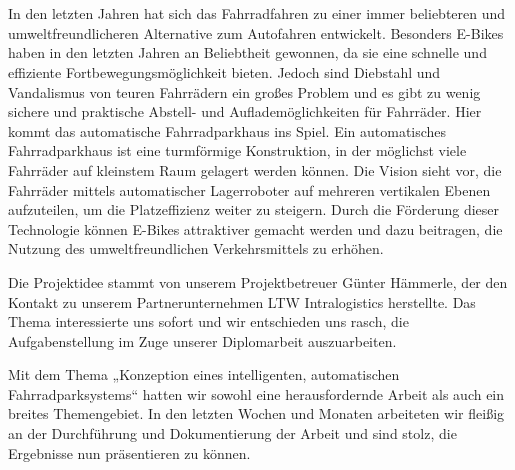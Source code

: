 \section*{}
In den letzten Jahren hat sich das Fahrradfahren zu einer immer beliebteren und umweltfreundlicheren Alternative zum Autofahren entwickelt. Besonders E-Bikes haben in den letzten Jahren an Beliebtheit gewonnen, da sie eine schnelle und effiziente Fortbewegungsmöglichkeit bieten. Jedoch sind Diebstahl und Vandalismus von teuren Fahrrädern ein großes Problem und es gibt zu wenig sichere und praktische Abstell- und Auflademöglichkeiten für Fahrräder. Hier kommt das automatische Fahrradparkhaus ins Spiel. Ein automatisches Fahrradparkhaus ist eine turmförmige Konstruktion, in der möglichst viele Fahrräder auf kleinstem Raum gelagert werden können. Die Vision sieht vor, die Fahrräder mittels automatischer Lagerroboter auf mehreren vertikalen Ebenen aufzuteilen, um die Platzeffizienz weiter zu steigern. Durch die Förderung dieser Technologie können E-Bikes attraktiver gemacht werden und dazu beitragen, die Nutzung des umweltfreundlichen Verkehrsmittels zu erhöhen.

\noindent Die Projektidee stammt von unserem Projektbetreuer Günter Hämmerle, der den Kontakt zu unserem Partnerunternehmen LTW Intralogistics herstellte. Das Thema interessierte uns sofort und wir entschieden uns rasch, die Aufgabenstellung im Zuge unserer Diplomarbeit auszuarbeiten.

\noindent Mit dem Thema „Konzeption eines intelligenten, automatischen Fahrradparksystems“ hatten wir sowohl eine herausfordernde Arbeit als auch ein breites Themengebiet. In den letzten Wochen und Monaten arbeiteten wir fleißig an der Durchführung und Dokumentierung der Arbeit und sind stolz, die Ergebnisse nun präsentieren zu können.